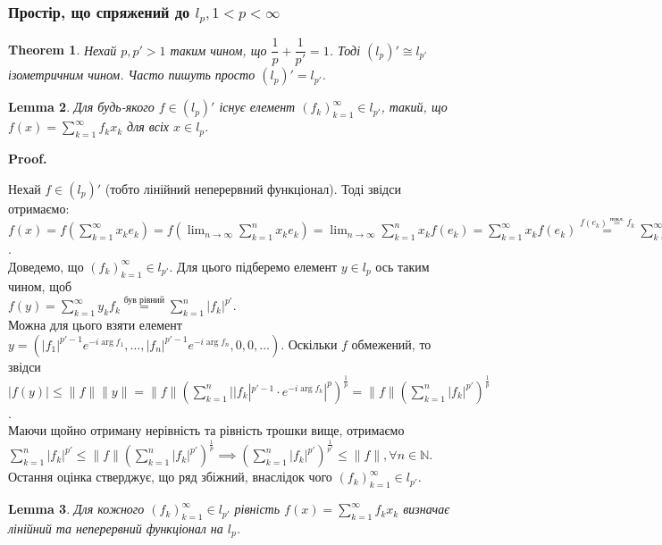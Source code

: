 \documentclass[a4paper, 10pt]{article}
\makeatletter
\theoremstyle{theoremdd}
\newtheorem{theorem}{Theorem}[subsection]
\theoremstyle{theoremdd}
\theoremstyle{theoremdd}
\theoremstyle{theoremdd}
\theoremstyle{theoremdd}
\theoremstyle{theoremdd}
\theoremstyle{theoremdd}
\newtheorem{lemma}[theorem]{Lemma}
\theoremstyle{theoremdd}
\renewenvironment{proof}[1][Proof.\\]{\par
\pushQED{\hfill \qed}%
\normalfont \topsep6\p@\@plus6\p@\relax
\trivlist
\item\relax
{\bfseries
#1\@addpunct{.}}\hspace\labelsep\ignorespaces
}{%
\popQED\endtrivlist\@endpefalse
}
\makeatother
\begin{document}
\subsubsection{Простір, що спряжений до $l_p, 1 < p < \infty$}
\begin{theorem}
Нехай $p,p' > 1$ таким чином, що $\dfrac{1}{p} + \dfrac{1}{p'} = 1$. Тоді $(l_p)' \cong l_{p'}$ ізометричним чином. Часто пишуть просто $(l_p)' = l_{p'}$.
\end{theorem}

\begin{lemma}
Для будь-якого $f \in (l_p)'$ існує елемент $(f_k)_{k=1}^\infty \in l_{p'}$, такий, що $f(x) = \displaystyle\sum_{k=1}^\infty f_k x_k$ для всіх $x \in l_p$.
\end{lemma}

\begin{proof}
Нехай $f \in (l_p)'$ (тобто лінійний неперервний функціонал). Тоді звідси отримаємо:\\
$f(x) = \displaystyle f\left( \sum_{k=1}^\infty x_k e_k \right) = f\left( \lim_{n \to \infty} \sum_{k=1}^n x_k e_k \right) = \lim_{n \to \infty} \sum_{k=1}^n x_k f(e_k) = \sum_{k=1}^\infty x_k f(e_k) \overset{f(e_k) \overset{\text{покл.}}{=} f_k}{=} \sum_{k=1}^\infty f_k x_k$.\\
Доведемо, що $(f_k)_{k=1}^\infty \in l_{p'}$. Для цього підберемо елемент $y \in l_p$ ось таким чином, щоб\\
$f(y) = \displaystyle\sum_{k=1}^\infty y_k f_k \overset{\text{був рівний}}{=} \sum_{k=1}^n |f_k|^{p'}$.\\
Можна для цього взяти елемент $y = \left( |f_1|^{p'-1}e^{-i \arg f_1}, \dots, |f_n|^{p'-1}e^{-i \arg f_n}, 0, 0, \dots \right)$. Оскільки $f$ обмежений, то звідси $\displaystyle |f(y)| \leq \|f\| \|y\| = \|f\| \left( \sum_{k=1}^n  ||f_k|^{p'-1} \cdot e^{-i \arg f_k}|^p \right)^{\frac{1}{p}} = \|f\| \left( \sum_{k=1}^n |f_k|^{p'} \right)^{\frac{1}{p}}$.\\
Маючи щойно отриману нерівність та рівність трошки вище, отримаємо\\
$\displaystyle\sum_{k=1}^n |f_k|^{p'} \leq \| f\| \left( \sum_{k=1}^n |f_k|^{p'} \right)^{\frac{1}{p}} \implies \left( \sum_{k=1}^n |f_k|^{p'} \right)^{\frac{1}{p'}} \leq \|f\|, \forall n \in \mathbb{N}$.\\
Остання оцінка стверджує, що ряд збіжний, внаслідок чого $(f_k)_{k=1}^{\infty} \in l_{p'}$.
\end{proof}

\begin{lemma}
Для кожного $(f_k)_{k=1}^\infty \in l_{p'}$ рівність $f(x) = \displaystyle\sum_{k=1}^\infty f_k x_k$ визначає лінійний та неперервний функціонал на $l_p$.
\end{lemma}
\end{document}
